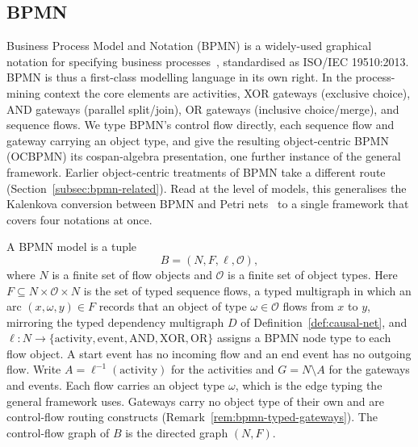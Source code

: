 \FloatBarrier
\subsection{BPMN}\label{sec:bpmn}

Business Process Model and Notation (BPMN) is a widely-used graphical notation for
specifying business processes~\cite{BusinessProcessModel}, standardised as ISO/IEC 19510:2013.
BPMN is thus a first-class modelling language in its own right.
In the process-mining context the core elements are activities, XOR gateways (exclusive
choice), AND gateways (parallel split/join), OR gateways (inclusive choice/merge), and
sequence flows. We type BPMN's control flow directly, each sequence flow and gateway carrying an
object type, and give the resulting object-centric BPMN (OCBPMN) its cospan-algebra presentation, one further
instance of the general framework. Earlier object-centric treatments of BPMN take a different route
(Section~\ref{subsec:bpmn-related}).
Read at the level of models, this generalises the Kalenkova conversion between BPMN and Petri nets~\cite{kalenkovaProcessMiningUsing2017} to a single framework that covers four notations at once.

\begin{definition}\label{def:bpmn}
  A BPMN model is a tuple
  \[
    B = (N, F, \ell, \mathcal{O}),
  \]
  where $N$ is a finite set of flow objects and $\mathcal{O}$ is a finite set of
  object types.
  Here $F \subseteq N \times \mathcal{O} \times N$ is the set of typed sequence flows,
  a typed multigraph in which an arc $(x,\omega,y)\in F$ records that an object of type
  $\omega\in\mathcal{O}$ flows from $x$ to $y$, mirroring the typed dependency multigraph
  $D$ of Definition~\ref{def:causal-net}, and
  $\ell : N \to \{\mathrm{activity}, \mathrm{event}, \mathrm{AND}, \mathrm{XOR}, \mathrm{OR}\}$
  assigns a BPMN node type to each flow object. A start event has no incoming flow and an end event
  has no outgoing flow.
  Write $A = \ell^{-1}(\mathrm{activity})$ for the activities and $G = N \setminus A$ for the
  gateways and events. Each flow carries an object type $\omega$, which is the edge typing the
  general framework uses. Gateways carry no
  object type of their own and are control-flow routing constructs
  (Remark~\ref{rem:bpmn-typed-gateways}).
  The control-flow graph of $B$ is the directed graph $(N, F)$.
\end{definition}

